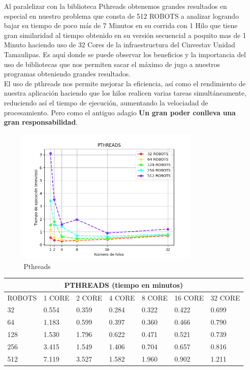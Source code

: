 \documentclass[oneside,twocolumn]{article}
\begin{document}
Al paralelizar con la biblioteca Pthreads obtenemos grandes resultados en especial en nuestro problema que consta de 512 ROBOTS a analizar logrando bajar su tiempo de poco más de 7 Minutos en su corrida con 1 Hilo que tiene gran similaridad al tiempo obtenido en su versión secuencial a poquito mas de 1 Minuto haciendo uso de 32 Cores de la infraestructura del Cinvestav Unidad Tamaulipas. Es aquí donde se puede observar los beneficios y la importancia del uso de bibliotecas que nos permiten sacar el máximo de jugo a nuestros programas obteniendo grandes resultados.\\

El uso de pthreads nos permite mejorar la eficiencia, así como el rendimiento de nuestra aplicación haciendo que los hilos realicen varias tareas simultáneamente, reduciendo así el tiempo de ejecución, aumentando la velociadad de procesamiento. Pero como el antiguo adagio \textbf{Un gran poder conlleva una gran responsabilidad}.

\begin{figure}[h]
    \centering
    \includegraphics[width=0.80\textwidth]{graficos/pthreads/pthreads.png}
    \caption{Pthreads}
    \label{fig:secuencial}
\end{figure}

\begin{center}
\begin{tabular}{ |p{2cm}||p{2cm}||p{2cm}||p{2cm}||p{2cm}||p{2cm}||p{2cm}| }
 \hline
 \multicolumn{7}{|c|}{PTHREADS (tiempo en minutos)} \\
 \hline
 ROBOTS & 1 CORE & 2 CORE & 4 CORE & 8 CORE & 16 CORE & 32 CORE\\
 \hline
 32   & 0.554 & 0.359 & 0.284 & 0.322 & 0.422 & 0.699\\ \hline
 64   & 1.183 & 0.599 & 0.397 & 0.360 & 0.466 & 0.790\\ \hline
 128  & 1.530 & 1.796 & 0.622 & 0.471 & 0.521 & 0.739\\ \hline
 256  & 3.415 & 1.549 & 1.406 & 0.704 & 0.657 & 0.816\\ \hline
 512  & 7.119 & 3.527 & 1.582 & 1.960 & 0.902 & 1.211\\ \hline
 \hline
\end{tabular}
\end{center}
\end{document}
